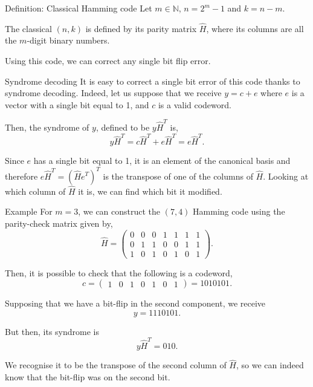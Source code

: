 \documentclass[a4paper]{article}
\begin{document}
\begin{parag}{Definition: Classical Hamming code}
    Let $m \in \mathbb{N}$, $n = 2^m - 1$ and $k = n - m$.

    The classical $\left(n, k\right)$  is defined by its parity matrix $\hat{H}$, where its columns are all the $m$-digit binary numbers. 

    Using this code, we can correct any single bit flip error.

    \begin{subparag}{Syndrome decoding}
        It is easy to correct a single bit error of this code thanks to syndrome decoding. Indeed, let us suppose that we receive $y = c + e$ where $e$ is a vector with a single bit equal to 1, and $c$ is a valid codeword.

        Then, the syndrome of $y$, defined to be $y\hat{H}^T$ is, 
        \[y\hat{H}^T = c\hat{H}^T + e\hat{H}^T = e\hat{H}^T.\]

        Since $e$ has a single bit equal to 1, it is an element of the canonical basis and therefore $e \hat{H}^T = \left(\hat{H} e^T\right)^T$ is the transpose of one of the columns of $\hat{H}$. Looking at which column of $\hat{H}$ it is, we can find which bit it modified.
    \end{subparag}

    \begin{subparag}{Example}
        For $m = 3$, we can construct the $\left(7, 4\right)$ Hamming code using the parity-check matrix given by, 
        \[\hat{H} = \begin{pmatrix} 0 & 0 & 0 & 1 & 1 & 1 & 1 \\ 0 & 1 & 1 & 0 & 0 & 1 & 1 \\ 1 & 0 & 1 & 0 & 1 & 0 & 1 \end{pmatrix}.\]

        Then, it is possible to check that the following is a codeword, 
        \[c = \begin{pmatrix} 1 & 0 & 1 & 0 & 1 & 0 & 1 \end{pmatrix} = 1010101.\]

        Supposing that we have a bit-flip in the second component, we receive
        \[y = 1110101.\]

        But then, its syndrome is 
        \[y \hat{H}^T = 010.\]

        We recognise it to be the transpose of the second column of $\hat{H}$, so we can indeed know that the bit-flip was on the second bit.
    \end{subparag}
\end{parag}
\end{document}
